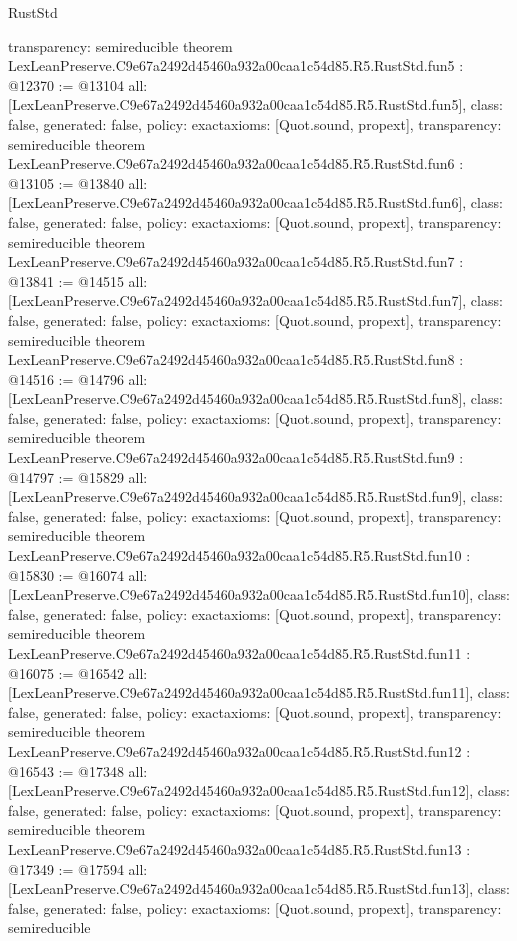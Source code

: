 \begin{lexlean}{RustStd}
\begin{coremodule}
{  transparency: semireducible
}
theorem LexLeanPreserve.C9e67a2492d45460a932a00caa1c54d85.R5.RustStd.fun5 : @12370 := @13104 {
  all: [LexLeanPreserve.C9e67a2492d45460a932a00caa1c54d85.R5.RustStd.fun5],
  class: false,
  generated: false,
  policy: exact{axioms: [Quot.sound, propext]},
  transparency: semireducible
}
theorem LexLeanPreserve.C9e67a2492d45460a932a00caa1c54d85.R5.RustStd.fun6 : @13105 := @13840 {
  all: [LexLeanPreserve.C9e67a2492d45460a932a00caa1c54d85.R5.RustStd.fun6],
  class: false,
  generated: false,
  policy: exact{axioms: [Quot.sound, propext]},
  transparency: semireducible
}
theorem LexLeanPreserve.C9e67a2492d45460a932a00caa1c54d85.R5.RustStd.fun7 : @13841 := @14515 {
  all: [LexLeanPreserve.C9e67a2492d45460a932a00caa1c54d85.R5.RustStd.fun7],
  class: false,
  generated: false,
  policy: exact{axioms: [Quot.sound, propext]},
  transparency: semireducible
}
theorem LexLeanPreserve.C9e67a2492d45460a932a00caa1c54d85.R5.RustStd.fun8 : @14516 := @14796 {
  all: [LexLeanPreserve.C9e67a2492d45460a932a00caa1c54d85.R5.RustStd.fun8],
  class: false,
  generated: false,
  policy: exact{axioms: [Quot.sound, propext]},
  transparency: semireducible
}
theorem LexLeanPreserve.C9e67a2492d45460a932a00caa1c54d85.R5.RustStd.fun9 : @14797 := @15829 {
  all: [LexLeanPreserve.C9e67a2492d45460a932a00caa1c54d85.R5.RustStd.fun9],
  class: false,
  generated: false,
  policy: exact{axioms: [Quot.sound, propext]},
  transparency: semireducible
}
theorem LexLeanPreserve.C9e67a2492d45460a932a00caa1c54d85.R5.RustStd.fun10 : @15830 := @16074 {
  all: [LexLeanPreserve.C9e67a2492d45460a932a00caa1c54d85.R5.RustStd.fun10],
  class: false,
  generated: false,
  policy: exact{axioms: [Quot.sound, propext]},
  transparency: semireducible
}
theorem LexLeanPreserve.C9e67a2492d45460a932a00caa1c54d85.R5.RustStd.fun11 : @16075 := @16542 {
  all: [LexLeanPreserve.C9e67a2492d45460a932a00caa1c54d85.R5.RustStd.fun11],
  class: false,
  generated: false,
  policy: exact{axioms: [Quot.sound, propext]},
  transparency: semireducible
}
theorem LexLeanPreserve.C9e67a2492d45460a932a00caa1c54d85.R5.RustStd.fun12 : @16543 := @17348 {
  all: [LexLeanPreserve.C9e67a2492d45460a932a00caa1c54d85.R5.RustStd.fun12],
  class: false,
  generated: false,
  policy: exact{axioms: [Quot.sound, propext]},
  transparency: semireducible
}
theorem LexLeanPreserve.C9e67a2492d45460a932a00caa1c54d85.R5.RustStd.fun13 : @17349 := @17594 {
  all: [LexLeanPreserve.C9e67a2492d45460a932a00caa1c54d85.R5.RustStd.fun13],
  class: false,
  generated: false,
  policy: exact{axioms: [Quot.sound, propext]},
  transparency: semireducible
}
\end{coremodule}
\end{lexlean}
